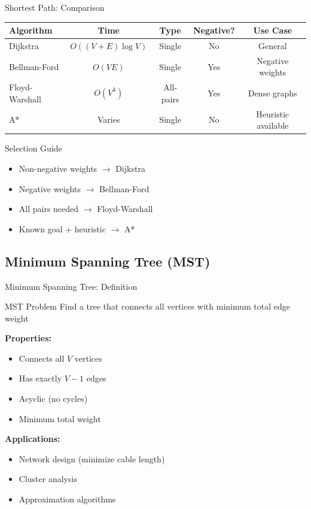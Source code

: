 \documentclass[aspectratio=169,xcolor=dvipsnames]{beamer}
\begin{document}
\begin{frame}{Shortest Path: Comparison}
  \begin{table}
    \centering
    \small
    \begin{tabular}{lcccc}
      \hline
      \textbf{Algorithm} & \textbf{Time} & \textbf{Type} & \textbf{Negative?} & \textbf{Use Case} \\
      \hline
      Dijkstra & $O((V+E) \log V)$ & Single & No & General \\
      Bellman-Ford & $O(VE)$ & Single & Yes & Negative weights \\
      Floyd-Warshall & $O(V^3)$ & All-pairs & Yes & Dense graphs \\
      A* & Varies & Single & No & Heuristic available \\
      \hline
    \end{tabular}
  \end{table}

  \vspace{0.3cm}
  \begin{block}{Selection Guide}
    \begin{itemize}
      \item Non-negative weights $\to$ Dijkstra
      \item Negative weights $\to$ Bellman-Ford
      \item All pairs needed $\to$ Floyd-Warshall
      \item Known goal + heuristic $\to$ A*
    \end{itemize}
  \end{block}
\end{frame}

\subsection{Minimum Spanning Tree (MST)}

\begin{frame}{Minimum Spanning Tree: Definition}
  \begin{block}{MST Problem}
    Find a tree that connects all vertices with minimum total edge weight
  \end{block}

  \vspace{0.3cm}
  \textbf{Properties:}
  \begin{itemize}
    \item Connects all $V$ vertices
    \item Has exactly $V-1$ edges
    \item Acyclic (no cycles)
    \item Minimum total weight
  \end{itemize}

  \vspace{0.3cm}
  \textbf{Applications:}
  \begin{itemize}
    \item Network design (minimize cable length)
    \item Cluster analysis
    \item Approximation algorithms
  \end{itemize}
\end{frame}
\end{document}

